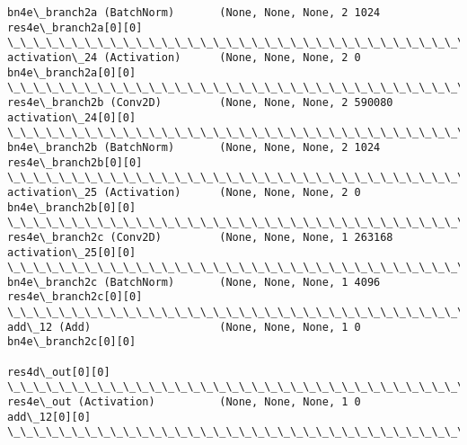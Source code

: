 \documentclass[11pt]{article}
\begin{document}
\begin{Verbatim}[commandchars=\\\{\}]
bn4e\_branch2a (BatchNorm)       (None, None, None, 2 1024        res4e\_branch2a[0][0]             
\_\_\_\_\_\_\_\_\_\_\_\_\_\_\_\_\_\_\_\_\_\_\_\_\_\_\_\_\_\_\_\_\_\_\_\_\_\_\_\_\_\_\_\_\_\_\_\_\_\_\_\_\_\_\_\_\_\_\_\_\_\_\_\_\_\_\_\_\_\_\_\_\_\_\_\_\_\_\_\_\_\_\_\_\_\_\_\_\_\_\_\_\_\_\_\_\_\_
activation\_24 (Activation)      (None, None, None, 2 0           bn4e\_branch2a[0][0]              
\_\_\_\_\_\_\_\_\_\_\_\_\_\_\_\_\_\_\_\_\_\_\_\_\_\_\_\_\_\_\_\_\_\_\_\_\_\_\_\_\_\_\_\_\_\_\_\_\_\_\_\_\_\_\_\_\_\_\_\_\_\_\_\_\_\_\_\_\_\_\_\_\_\_\_\_\_\_\_\_\_\_\_\_\_\_\_\_\_\_\_\_\_\_\_\_\_\_
res4e\_branch2b (Conv2D)         (None, None, None, 2 590080      activation\_24[0][0]              
\_\_\_\_\_\_\_\_\_\_\_\_\_\_\_\_\_\_\_\_\_\_\_\_\_\_\_\_\_\_\_\_\_\_\_\_\_\_\_\_\_\_\_\_\_\_\_\_\_\_\_\_\_\_\_\_\_\_\_\_\_\_\_\_\_\_\_\_\_\_\_\_\_\_\_\_\_\_\_\_\_\_\_\_\_\_\_\_\_\_\_\_\_\_\_\_\_\_
bn4e\_branch2b (BatchNorm)       (None, None, None, 2 1024        res4e\_branch2b[0][0]             
\_\_\_\_\_\_\_\_\_\_\_\_\_\_\_\_\_\_\_\_\_\_\_\_\_\_\_\_\_\_\_\_\_\_\_\_\_\_\_\_\_\_\_\_\_\_\_\_\_\_\_\_\_\_\_\_\_\_\_\_\_\_\_\_\_\_\_\_\_\_\_\_\_\_\_\_\_\_\_\_\_\_\_\_\_\_\_\_\_\_\_\_\_\_\_\_\_\_
activation\_25 (Activation)      (None, None, None, 2 0           bn4e\_branch2b[0][0]              
\_\_\_\_\_\_\_\_\_\_\_\_\_\_\_\_\_\_\_\_\_\_\_\_\_\_\_\_\_\_\_\_\_\_\_\_\_\_\_\_\_\_\_\_\_\_\_\_\_\_\_\_\_\_\_\_\_\_\_\_\_\_\_\_\_\_\_\_\_\_\_\_\_\_\_\_\_\_\_\_\_\_\_\_\_\_\_\_\_\_\_\_\_\_\_\_\_\_
res4e\_branch2c (Conv2D)         (None, None, None, 1 263168      activation\_25[0][0]              
\_\_\_\_\_\_\_\_\_\_\_\_\_\_\_\_\_\_\_\_\_\_\_\_\_\_\_\_\_\_\_\_\_\_\_\_\_\_\_\_\_\_\_\_\_\_\_\_\_\_\_\_\_\_\_\_\_\_\_\_\_\_\_\_\_\_\_\_\_\_\_\_\_\_\_\_\_\_\_\_\_\_\_\_\_\_\_\_\_\_\_\_\_\_\_\_\_\_
bn4e\_branch2c (BatchNorm)       (None, None, None, 1 4096        res4e\_branch2c[0][0]             
\_\_\_\_\_\_\_\_\_\_\_\_\_\_\_\_\_\_\_\_\_\_\_\_\_\_\_\_\_\_\_\_\_\_\_\_\_\_\_\_\_\_\_\_\_\_\_\_\_\_\_\_\_\_\_\_\_\_\_\_\_\_\_\_\_\_\_\_\_\_\_\_\_\_\_\_\_\_\_\_\_\_\_\_\_\_\_\_\_\_\_\_\_\_\_\_\_\_
add\_12 (Add)                    (None, None, None, 1 0           bn4e\_branch2c[0][0]              
                                                                 res4d\_out[0][0]                  
\_\_\_\_\_\_\_\_\_\_\_\_\_\_\_\_\_\_\_\_\_\_\_\_\_\_\_\_\_\_\_\_\_\_\_\_\_\_\_\_\_\_\_\_\_\_\_\_\_\_\_\_\_\_\_\_\_\_\_\_\_\_\_\_\_\_\_\_\_\_\_\_\_\_\_\_\_\_\_\_\_\_\_\_\_\_\_\_\_\_\_\_\_\_\_\_\_\_
res4e\_out (Activation)          (None, None, None, 1 0           add\_12[0][0]                     
\_\_\_\_\_\_\_\_\_\_\_\_\_\_\_\_\_\_\_\_\_\_\_\_\_\_\_\_\_\_\_\_\_\_\_\_\_\_\_\_\_\_\_\_\_\_\_\_\_\_\_\_\_\_\_\_\_\_\_\_\_\_\_\_\_\_\_\_\_\_\_\_\_\_\_\_\_\_\_\_\_\_\_\_\_\_\_\_\_\_\_\_\_\_\_\_\_\_

\end{Verbatim}
\end{document}
